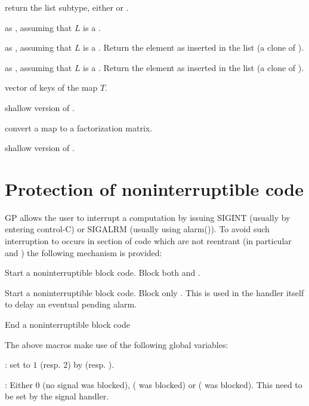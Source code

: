  return the list subtype, either  or
.

 as ,
assuming that $L$ is a .

 as ,
assuming that $L$ is a . Return the element as inserted
in the list (a clone of ).

 as ,
assuming that $L$ is a . Return the element as inserted
in the list (a clone of ).

 vector of keys of the map $T$.

 shallow version of .

 convert a map to a factorization matrix.

 shallow version of .

\section{Protection of noninterruptible code}

GP allows the user to interrupt a computation by issuing SIGINT
(usually by entering control-C) or SIGALRM (usually using alarm()).
To avoid such interruption to occurs in section of code which are not
reentrant (in particular  and )
the following mechanism is provided:

  Start a noninterruptible block code. Block both  and .

  Start a noninterruptible block code. Block only .
This is used in the  handler itself to delay an eventual pending
alarm.

  End a noninterruptible block code

The above macros make use of the following global variables:

: set to $1$ (resp. $2$) by 
(resp. ).

: Either $0$ (no signal was blocked), 
( was blocked) or  ( was blocked).
This need to be set by the signal handler.

